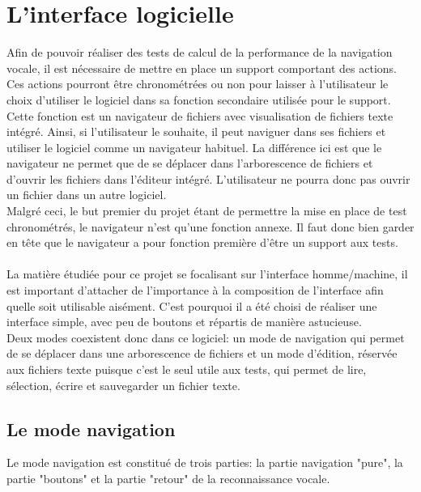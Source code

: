 \documentclass[a4paper, 11pt]{report}
\begin{document}
	\chapter{L'interface logicielle}
	
	
	Afin de pouvoir réaliser des tests de calcul de la performance de la navigation vocale, il est nécessaire de mettre en place un support comportant des actions. Ces actions pourront \^etre chronométrées ou non pour laisser à l'utilisateur le choix d'utiliser le logiciel dans sa fonction secondaire utilisée pour le support. Cette fonction est un navigateur de fichiers avec visualisation de fichiers texte intégré. Ainsi, si l'utilisateur le souhaite, il peut naviguer dans ses fichiers et utiliser le logiciel comme un navigateur habituel. La différence ici est que le navigateur ne permet que de se déplacer dans l'arborescence de fichiers et d'ouvrir les fichiers dans l'éditeur intégré. L'utilisateur ne pourra donc pas ouvrir un fichier dans un autre logiciel. \\
	Malgré ceci, le but premier du projet étant de permettre la mise en place de test chronométrés, le navigateur n'est qu'une fonction annexe. Il faut donc bien garder en t\^ete que le navigateur a pour fonction première d'\^etre un support aux tests.\\ \ \\	
	La matière étudiée pour ce projet se focalisant sur l'interface homme/machine, il est important d'attacher de l'importance à la composition de l'interface afin quelle soit utilisable aisément. C'est pourquoi il a été choisi de réaliser une interface simple, avec peu de boutons et répartis de manière astucieuse.\\
	Deux modes coexistent donc dans ce logiciel: un mode de navigation qui permet de se déplacer dans une arborescence de fichiers et un mode d'édition, réservée aux fichiers texte puisque c'est le seul utile aux tests, qui permet de lire, sélection, écrire et sauvegarder un fichier texte.
	
	\section{Le mode navigation}
	
	Le mode navigation est constitué de trois parties: la partie navigation "pure", la partie "boutons" et la partie "retour" de la reconnaissance vocale.\\
	
\end{document}
